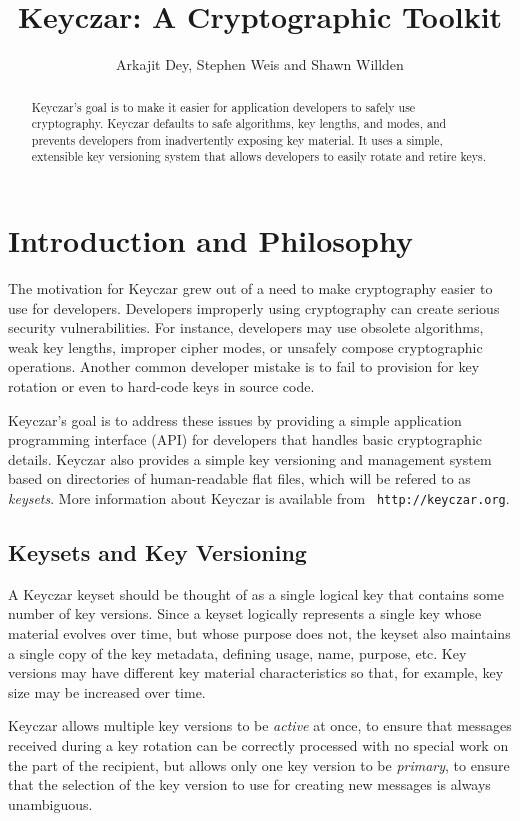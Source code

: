 \documentclass{llncs}
\title{Keyczar: A Cryptographic Toolkit}
\author{Arkajit Dey\inst{1}, Stephen Weis\inst{2} and Shawn
  Willden\inst{3} }
\institute{Massachusetts Institute of Technology, Cambridge, MA, USA 02139
\and
Google Inc., Mountain View, CA, USA 94043
\and
Google Inc., Boulder, CO, USA 80302}
\begin{document}
\maketitle

\begin{abstract}
Keyczar's goal is to make it easier for application developers to
safely use cryptography. Keyczar defaults to safe algorithms, key
lengths, and modes, and prevents developers from inadvertently
exposing key material. It uses a simple, extensible key versioning
system that allows developers to easily rotate and retire keys.
\end{abstract}

\section{Introduction and Philosophy}

The motivation for Keyczar grew out of a need to make cryptography
easier to use for developers. Developers improperly using cryptography
can create serious security vulnerabilities. For instance, developers
may use obsolete algorithms, weak key lengths, improper cipher modes,
or unsafely compose cryptographic operations. Another common developer
mistake is to fail to provision for key rotation or even to hard-code
keys in source code.

Keyczar's goal is to address these issues by providing a simple
application programming interface (API) for developers that handles
basic cryptographic details. Keyczar also provides a simple key
versioning and management system based on directories of
human-readable flat files, which will be refered to as
\emph{keysets}. More information about Keyczar is available from {\tt
  http://keyczar.org}.

\subsection{Keysets and Key Versioning}

A Keyczar keyset should be thought of as a single logical key that
contains some number of key versions. Since a keyset logically
represents a single key whose material evolves over time, but whose
purpose does not, the keyset also maintains a single copy of the key
metadata, defining usage, name, purpose, etc.  Key versions may have
different key material characteristics so that, for example, key size
may be increased over time.

Keyczar allows multiple key versions to be \emph{active} at once, to
ensure that messages received during a key rotation can be correctly
processed with no special work on the part of the recipient, but
allows only one key version to be \emph{primary}, to ensure that the
selection of the key version to use for creating new messages is
always unambiguous.
\end{document}
